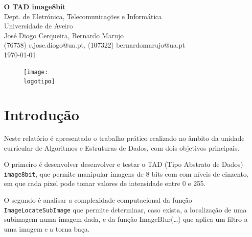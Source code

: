 \documentclass{report}
\begin{document}
%
\def\titulo{O TAD image8bit}
\def\data{\today}
\def\autores{José Diogo Cerqueira, Bernardo Marujo}
\def\autorescontactos{(76758) c.jose.diogo@ua.pt, (107322) bernardomarujo@ua.pt}
\def\departamento{Dept. de Eletrónica, Telecomunicações e Informática}
\def\empresa{Universidade de Aveiro}
\def\logotipo{ua.pdf}
%
%

%
%
\begin{titlepage}

\begin{center}
%
\vspace*{50mm}
%
{\Huge\textbf{\titulo}}\\
{\Large \departamento\\ \empresa}\\
%
\vspace{10mm}
%
%
{\LARGE \autores\\ \autorescontactos} \\ 
%
\vspace{10mm}
%
\data
%
\vspace{20mm}
%
\begin{figure}[h]
\center
\texttt{[image: \\logotipo]}
\end{figure}
%
\end{center}
%
\end{titlepage}


\tableofcontents



\clearpage
{}


\chapter{Introdução}

Neste relatório é apresentado o trabalho prático realizado no âmbito da unidade curricular de Algoritmos e Estruturas de Dados, com dois objetivos principais.
\par
O primeiro é desenvolver desenvolver e testar o TAD (Tipo Abstrato de Dados) \texttt{image8bit}, que permite manipular imagens de 8 bits com com níveis de cinzento, em que cada pixel pode tomar valores de intensidade entre 0 e 255.
\par
O segundo é analisar a complexidade computacional da função \texttt{ImageLocateSubImage} que permite determinar, caso exista, a localização de uma subimagem numa imagem dada, e da função ImageBlur(…) que aplica um filtro a uma imagem e a torna baça.
\end{document}
